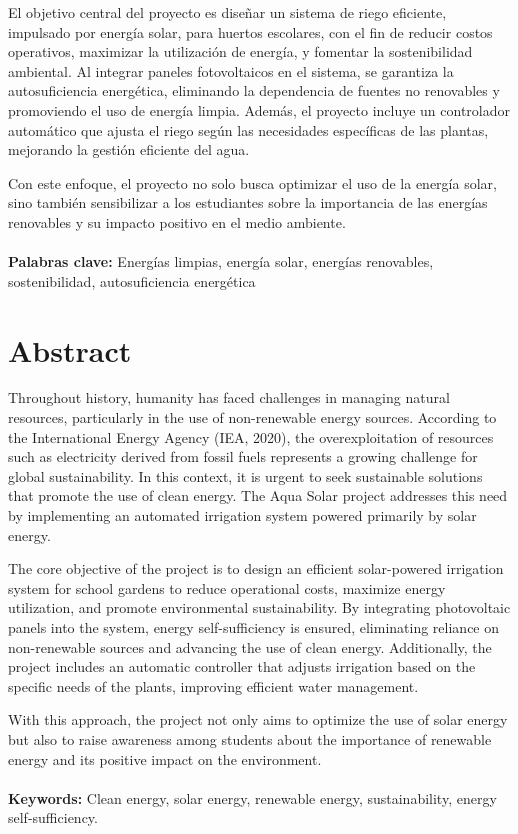 \documentclass[12pt]{article}
\begin{document}
El objetivo central del proyecto es diseñar un sistema de riego eficiente, impulsado por energía solar, para huertos escolares, con el fin de reducir costos operativos, maximizar la utilización de energía, y fomentar la sostenibilidad ambiental. Al integrar paneles fotovoltaicos en el sistema, se garantiza la autosuficiencia energética, eliminando la dependencia de fuentes no renovables y promoviendo el uso de energía limpia. Además, el proyecto incluye un controlador automático que ajusta el riego según las necesidades específicas de las plantas, mejorando la gestión eficiente del agua.

Con este enfoque, el proyecto no solo busca optimizar el uso de la energía solar, sino también sensibilizar a los estudiantes sobre la importancia de las energías renovables y su impacto positivo en el medio ambiente.
\\~\\
\textbf{Palabras clave:} Energías limpias, energía solar, energías renovables, sostenibilidad, autosuficiencia energética
\newpage
\section{Abstract}
Throughout history, humanity has faced challenges in managing natural resources, particularly in the use of non-renewable energy sources. According to the International Energy Agency (IEA, 2020), the overexploitation of resources such as electricity derived from fossil fuels represents a growing challenge for global sustainability. In this context, it is urgent to seek sustainable solutions that promote the use of clean energy. The Aqua Solar project addresses this need by implementing an automated irrigation system powered primarily by solar energy.

The core objective of the project is to design an efficient solar-powered irrigation system for school gardens to reduce operational costs, maximize energy utilization, and promote environmental sustainability. By integrating photovoltaic panels into the system, energy self-sufficiency is ensured, eliminating reliance on non-renewable sources and advancing the use of clean energy. Additionally, the project includes an automatic controller that adjusts irrigation based on the specific needs of the plants, improving efficient water management.

With this approach, the project not only aims to optimize the use of solar energy but also to raise awareness among students about the importance of renewable energy and its positive impact on the environment.
\\~\\
\textbf{Keywords:} Clean energy, solar energy, renewable energy, sustainability, energy self-sufficiency.
\newpage
\renewcommand{\contentsname}{Tabla de Contenido}
\tableofcontents
\newpage
\end{document}
